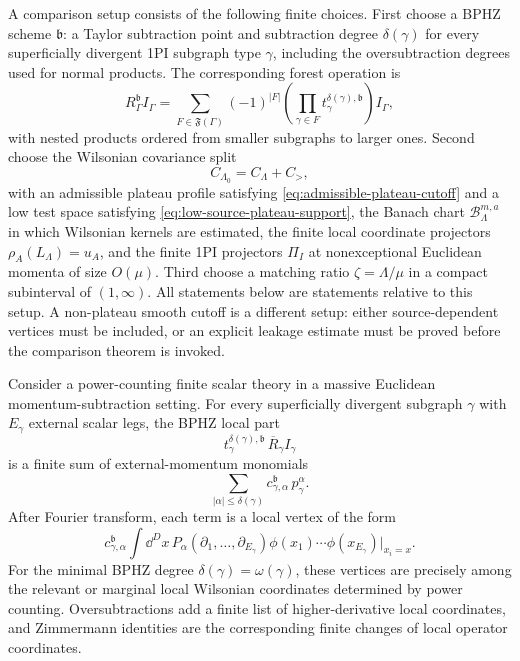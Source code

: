 \begin{definition}
\label{def:bphz-wilsonian-comparison-setup}
A comparison setup consists of the following finite choices.
First choose a BPHZ scheme \(\mathfrak b\): a Taylor subtraction point and
subtraction degree \(\delta(\gamma)\) for every superficially divergent
1PI subgraph type \(\gamma\), including the oversubtraction degrees used for
normal products.  The corresponding forest operation is
\[
  R_\Gamma^{\mathfrak b}I_\Gamma
  =
  \sum_{F\in\mathfrak F(\Gamma)}
  (-1)^{|F|}
  \left(\prod_{\gamma\in F} t_{\gamma}^{\delta(\gamma),\mathfrak b}\right)
  I_\Gamma ,
\]
with nested products ordered from smaller subgraphs to larger ones.  Second
choose the Wilsonian covariance split
\[
  C_{\Lambda_0}=C_\Lambda+C_{>},
\]
with an admissible plateau profile satisfying
\eqref{eq:admissible-plateau-cutoff} and a low test space satisfying
\eqref{eq:low-source-plateau-support}, the Banach chart
\(\mathcal B_{\Lambda}^{m,a}\) in which Wilsonian kernels are estimated, the
finite local coordinate projectors \(\rho_A(L_\Lambda)=u_A\), and the finite
1PI projectors \(\Pi_I\) at nonexceptional Euclidean momenta of size
\(O(\mu)\).  Third choose a matching ratio \(\zeta=\Lambda/\mu\) in a compact
subinterval of \((1,\infty)\).  All statements below are statements relative
to this setup.  A non-plateau smooth cutoff is a different setup: either
source-dependent vertices must be included, or an explicit leakage estimate
must be proved before the comparison theorem is invoked.
\end{definition}

\begin{proposition}
\label{prop:bphz-local-parts-wilsonian-coordinates}
Consider a power-counting finite scalar theory in a massive Euclidean
momentum-subtraction setting.  For every superficially divergent subgraph
\(\gamma\) with \(E_\gamma\) external scalar legs, the BPHZ local part
\[
  t_{\gamma}^{\delta(\gamma),\mathfrak b}\,\overline R_\gamma I_\gamma
\]
is a finite sum of external-momentum monomials
\[
  \sum_{|\alpha|\leq\delta(\gamma)}
  c_{\gamma,\alpha}^{\mathfrak b}\,p_\gamma^\alpha .
\]
After Fourier transform, each term is a local vertex of the form
\[
  c_{\gamma,\alpha}^{\mathfrak b}
  \int\dd^Dx\,
  P_{\alpha}(\partial_1,\ldots,\partial_{E_\gamma})
  \phi(x_1)\cdots\phi(x_{E_\gamma})\big|_{x_i=x}.
\]
For the minimal BPHZ degree
\(\delta(\gamma)=\omega(\gamma)\), these vertices are precisely among the
relevant or marginal local Wilsonian coordinates determined by power
counting.  Oversubtractions add a finite list of higher-derivative local
coordinates, and Zimmermann identities are the corresponding finite changes
of local operator coordinates.
\end{proposition}

